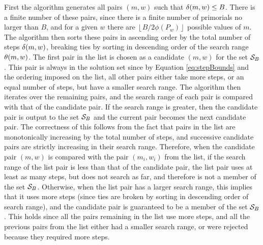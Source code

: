 \documentclass{ucalgthes1}
\theoremstyle{definition}
\newcommand{\floor}[1]{\left\lfloor #1 \right\rfloor}
\begin{document}
First the algorithm generates all pairs $(m, w)$ such that $\delta(m, w) \le B$.  There is a finite number of these pairs, since there is a finite number of primorials no larger than $B$, and for a given $w$ there are $\floor{B / 2\phi(P_w)}$ possible values of $m$.  The algorithm then sorts these pairs in ascending order by the total number of steps $\delta(m, w)$, breaking ties by sorting in descending order of the search range $\theta(m, w)$.  The first pair in the list is chosen as a candidate $(m, w)$ for the set $\mathcal S_B$.  This pair is always in the solution set since by Equation \eqref{eq:stepBounds} and the ordering imposed on the list, all other pairs either take more steps, or an equal number of steps, but have a smaller search range.  The algorithm then iterates over the remaining pairs, and the search range of each pair is compared with that of the candidate pair.  If the search range is greater, then the candidate pair is output to the set $\mathcal S_B$ and the current pair becomes the next candidate pair.  The correctness of this follows from the fact that pairs in the list are monotonically increasing by the total number of steps, and successive candidate pairs are strictly increasing in their search range.  Therefore, when the candidate pair $(m, w)$ is compared with the pair $(m_i, w_i)$ from the list, if the search range of the list pair is less than that of the candidate pair, the list pair uses at least as many steps, but does not search as far, and therefore is not a member of the set $\mathcal S_B$.  Otherwise, when the list pair has a larger search range, this implies that it uses more steps (since ties are broken by sorting in descending order of search range), and the candidate pair is guaranteed to be a member of the set $\mathcal S_B$.  This holds since all the pairs remaining in the list use more steps, and all the previous pairs from the list either had a smaller search range, or were rejected because they required more steps.
\end{document}
